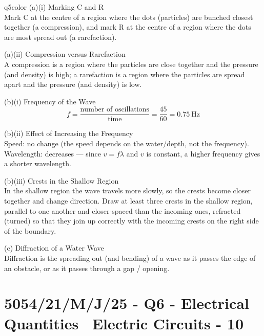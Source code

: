 \documentclass[11pt,a4paper]{article}
\newcommand{\examq}[4]{\section[#1 - Q#2]{#1 - Q#2 - #3 - #4}}
\begin{document}
\begin{ansbox}{q5color}
(a)(i) Marking C and R\\[4pt]
Mark C at the centre of a region where the dots (particles) are bunched closest together (a compression), and mark R at the centre of a region where the dots are most spread out (a rarefaction).

\vspace{4pt}
(a)(ii) Compression versus Rarefaction\\[4pt]
A compression is a region where the particles are close together and the pressure (and density) is high; a rarefaction is a region where the particles are spread apart and the pressure (and density) is low.

\vspace{4pt}
(b)(i) Frequency of the Wave\\[4pt]
\[ f = \frac{\text{number of oscillations}}{\text{time}} = \frac{45}{60} = \boxed{0.75\ \text{Hz}} \]

\vspace{4pt}
(b)(ii) Effect of Increasing the Frequency\\[4pt]
Speed: no change (the speed depends on the water/depth, not the frequency). Wavelength: decreases --- since $v = f\lambda$ and $v$ is constant, a higher frequency gives a shorter wavelength.

\vspace{4pt}
(b)(iii) Crests in the Shallow Region\\[4pt]
In the shallow region the wave travels more slowly, so the crests become closer together and change direction. Draw at least three crests in the shallow region, parallel to one another and closer-spaced than the incoming ones, refracted (turned) so that they join up correctly with the incoming crests on the right side of the boundary.

\vspace{4pt}
(c) Diffraction of a Water Wave\\[4pt]
Diffraction is the spreading out (and bending) of a wave as it passes the edge of an obstacle, or as it passes through a gap / opening.
\end{ansbox}

\examq{5054/21/M/J/25}{6}{Electrical Quantities \textperiodcentered\ Electric Circuits}{10}
\end{document}
